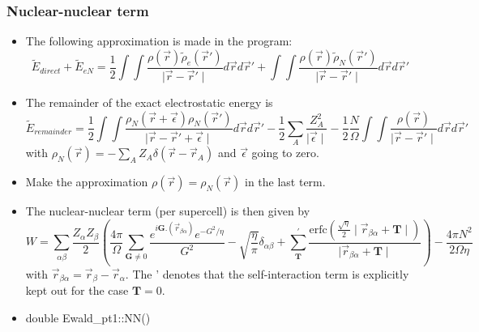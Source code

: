 \documentclass[8pt]{beamer}
\begin{document}
\begin{frame}

   \frametitle{Nuclear-nuclear term}
   \begin{itemize}
\item The following approximation is made in the program:
\begin{equation}
\tilde{E}_{direct} + \tilde{E}_{eN} = \frac{1}{2} \int \int \frac{\rho(\vec{r}) \tilde{\rho}_e(\vec{r}')}{\mid \vec{r} - \vec{r}' \mid} d\vec{r} d\vec{r}' + \int \int \frac{\rho(\vec{r}) \tilde{\rho}_N(\vec{r}')}{\mid \vec{r} - \vec{r}' \mid} d\vec{r} d\vec{r}'
\end{equation}
\item The remainder of the exact electrostatic energy is 
\begin{equation}
\tilde{E}_{remainder} = \frac{1}{2} \int \int \frac{\rho_N(\vec{r} + \vec{\epsilon}) \rho_N(\vec{r}')}{\mid \vec{r} - \vec{r}' + \vec{\epsilon} \mid} d\vec{r} d\vec{r}' - \frac{1}{2} \sum\limits_A \frac{Z_A^2}{\mid \vec{\epsilon} \mid} - \frac{1}{2} \frac{N}{\Omega} \int \int \frac{\rho(\vec{r})}{\mid \vec{r} - \vec{r}' \mid} d\vec{r} d\vec{r}' \label{koekoek}
\end{equation}
with $\rho_N(\vec{r}) = - \sum\limits_A Z_A \delta(\vec{r} - \vec{r}_A)$ and $\vec{\epsilon}$ going to zero.
\item Make the approximation $\rho(\vec{r}) = \rho_N(\vec{r})$ in the last term.
\item The nuclear-nuclear term (per supercell) is then given by
\begin{equation}
W = \sum\limits_{\alpha\beta} \frac{Z_{\alpha}Z_{\beta}}{2} \left( \frac{4\pi}{\Omega} \sum\limits_{\mathbf{G} \neq 0} \frac{e^{i \mathbf{G}.(\vec{r}_{\beta\alpha})} e^{-G^2/\eta}}{G^2} - \sqrt{\frac{\eta}{\pi}} \delta_{\alpha\beta} + \sum\limits_{\mathbf{T}}^{'} \frac{\text{erfc}\left( \frac{\sqrt{\eta}}{2} \mid \vec{r}_{\beta\alpha} + \mathbf{T} \mid \right)}{\mid \vec{r}_{\beta\alpha} + \mathbf{T} \mid}  \right) - \frac{4 \pi N^2}{2 \Omega \eta} \label{gjgj3}
\end{equation}
with $\vec{r}_{\beta\alpha} = \vec{r}_{\beta} - \vec{r}_{\alpha}$. The ' denotes that the self-interaction term is explicitly kept out for the case $\mathbf{T} = 0$.
\item double Ewald\_pt1::NN()
\end{itemize}
\end{frame}
\end{document}
